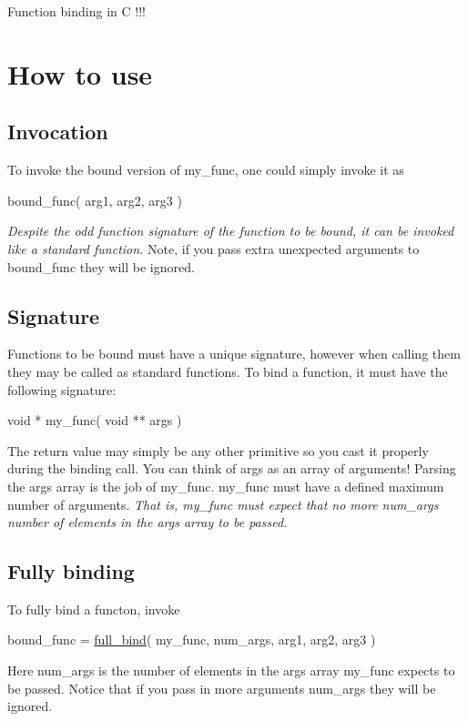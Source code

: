 Function binding in C !!!

\section*{How to use}

\subsection*{Invocation}

To invoke the bound version of {\ttfamily my\+\_\+func}, one could simply invoke it as 
\begin{DoxyCode}
bound\_func( arg1, arg2, arg3 )
\end{DoxyCode}
 {\itshape Despite the odd function signature of the function to be bound, it can be invoked like a standard function.} Note, if you pass extra unexpected arguments to {\ttfamily bound\+\_\+func} they will be ignored.

\subsection*{Signature}

Functions to be bound must have a unique signature, however when calling them they may be called as standard functions. To bind a function, it must have the following signature\+: 
\begin{DoxyCode}
\textcolor{keywordtype}{void} * my\_func( \textcolor{keywordtype}{void} ** args )
\end{DoxyCode}
 The return value may simply be any other primitive so you cast it properly during the binding call. You can think of {\ttfamily args} as an array of arguments! Parsing the {\ttfamily args} array is the job of {\ttfamily my\+\_\+func}. {\ttfamily my\+\_\+func} must have a defined maximum number of \textquotesingle{}arguments\textquotesingle{}. {\itshape That is, {\ttfamily my\+\_\+func} must expect that no more {\ttfamily num\+\_\+args} number of elements in the {\ttfamily args} array to be passed.}

\subsection*{Fully binding}

To fully bind a functon, invoke 
\begin{DoxyCode}
bound\_func = \hyperlink{bind_8c_aba8492ffd71864427a5cddc0c3888454}{full\_bind}( my\_func, num\_args, arg1, arg2, arg3 )
\end{DoxyCode}
 Here {\ttfamily num\+\_\+args} is the number of elements in the {\ttfamily args} array {\ttfamily my\+\_\+func} expects to be passed. Notice that if you pass in more arguments {\ttfamily num\+\_\+args} they will be ignored.

